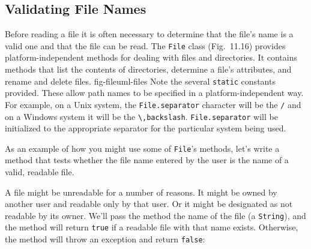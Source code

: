 \subsection{Validating File Names}
\noindent Before reading a file it is often necessary to determine
that the file's name is a valid one and that the file can
be read. The {\tt File} class (Fig.~11.16) provides
platform-independent methods for dealing with files and directories.
It contains methods that list the contents of directories, determine
a file's attributes, and rename and delete files.
{fig-fileuml-files}
Note the several {\tt static} constants provided.  These allow
path names to be specified in a platform-independent way.  For example,
on a Unix system, the {\tt File.separator} character will be the
\verb|/| and on a Windows system it will be the \verb|\,backslash|. {\tt File.separator}
will be initialized to the appropriate separator for the particular
system being used.


\noindent As an example of how you might use some of {\tt File}'s methods, let's
write a method that tests whether the file name entered by the user is
the name of a valid, readable file.

A file might be unreadable for a number of reasons.  It might be owned by
another user and readable only by that user.  Or it might be designated
as not readable by its owner.   We'll pass the method the name of the
file (a {\tt String}), and the method will return {\tt true} if a
readable file with that name exists.   Otherwise, the method will throw
an exception and return {\tt false}:

